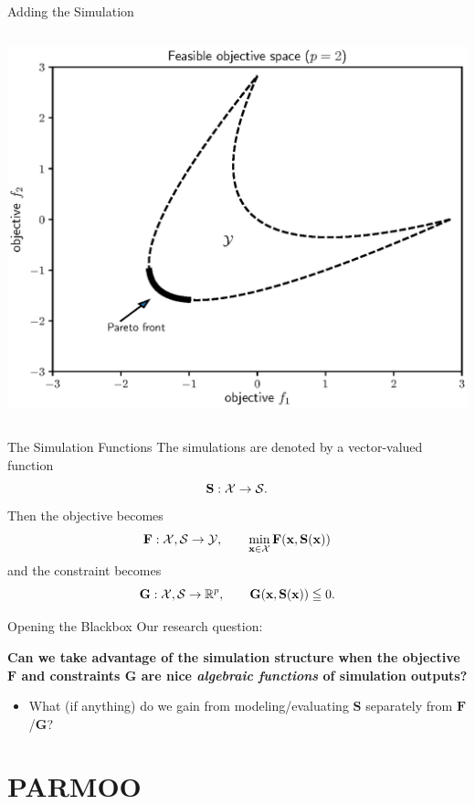 \documentclass[aspectratio=169]{beamer}
\newcommand{\cX}{\mathbf{\mathcal{X}}}
\newcommand{\vx}{\mathbf{x}}
\newcommand{\vF}{\mathbf{F}}
\newcommand{\vG}{\mathbf{G}}
\newcommand{\vS}{\mathbf{S}}
\begin{document}
\begin{frame}{Adding the Simulation}
\begin{columns}
\begin{column}{.35\textwidth}
\includegraphics[width=\textwidth]{convex_pareto.eps}\\
\end{column}
\end{columns}
\end{frame}

\begin{frame}{The Simulation Functions}
The simulations are denoted by a vector-valued function
$$\vS : \cX \rightarrow {\bf \cal S}.$$
Then the objective becomes
$$\vF : \cX, {\bf \cal S} \rightarrow {\cal Y},
\qquad \min_{\vx\in\cX}\vF(\vx, \vS(\vx))$$
and the constraint becomes
$$\vG : \cX, {\bf \cal S} \rightarrow \mathbb{R}^p,
\qquad \vG(\vx, \vS(\vx)) \leqq 0.$$
\end{frame}

\begin{frame}{Opening the Blackbox}
Our research question:\\

\bigskip

{\bf \large Can we take advantage of the simulation structure when the
objective $\vF$ and constraints $\vG$ are nice {\it algebraic functions} of
simulation outputs?}

\begin{itemize}
\item What (if anything) do we gain from modeling/evaluating $\vS$
separately from $\vF$/$\vG$?
\end{itemize}
\end{frame}

\section{PARMOO}
\end{document}

